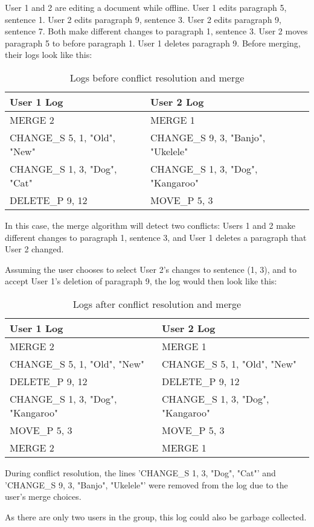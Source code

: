 User 1 and 2 are editing a document while offline. 
User 1 edits paragraph 5, sentence 1. 
User 2 edits paragraph 9, sentence 3. 
User 2 edits paragraph 9, sentence 7.
Both make different changes to paragraph 1, sentence 3. 
User 2 moves paragraph 5 to before paragraph 1. 
User 1 deletes paragraph 9. 
Before merging, their logs look like this:

\begin{table}[h!]
\begin{center}
 \begin{tabular} {|p{7cm}|p{7cm}|}
  \hline
   User 1 Log & User 2 Log \\
  \hline \hline
   MERGE 2 & MERGE 1 \\
   CHANGE\_S 5, 1, "Old", "New" & CHANGE\_S 9, 3, "Banjo", "Ukelele" \\
   CHANGE\_S 1, 3, "Dog", "Cat" & CHANGE\_S 1, 3, "Dog", "Kangaroo" \\
   DELETE\_P 9, 12 & MOVE\_P 5, 3 \\
  \hline 
 \end{tabular}
\end{center}
\caption{Logs before conflict resolution and merge}
\label{table:ex2_before}
\end{table}

In this case, the merge algorithm will detect two conflicts: Users 1 and 2 make different
changes to paragraph 1, sentence 3, and User 1 deletes a paragraph that User 2 changed.

Assuming the user chooses to select User 2's changes to sentence (1, 3), and to accept
User 1's deletion of paragraph 9, the log would then look like this:

\begin{table}[h!]
\begin{center}
 \begin{tabular} {|p{7cm}|p{7cm}|}
  \hline
   User 1 Log & User 2 Log \\
  \hline \hline
   MERGE 2 & MERGE 1 \\
   CHANGE\_S 5, 1, "Old", "New" & CHANGE\_S 5, 1, "Old", "New" \\
   DELETE\_P 9, 12 & DELETE\_P 9, 12 \\
   CHANGE\_S 1, 3, "Dog", "Kangaroo" & CHANGE\_S 1, 3, "Dog", "Kangaroo" \\
   MOVE\_P 5, 3 & MOVE\_P 5, 3 \\  
   MERGE 2 & MERGE 1 \\
  \hline
 \end{tabular}
\end{center}
\caption{Logs after conflict resolution and merge}
\label{table:ex2_after}
\end{table}

During conflict resolution, the lines 'CHANGE\_S 1, 3, "Dog", "Cat"' and 
'CHANGE\_S 9, 3, "Banjo", "Ukelele"' were removed from the log due to the user's
merge choices.

As there are only two users in the group, this log could also be garbage collected.




